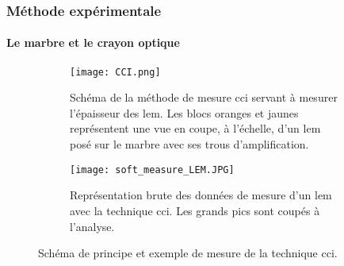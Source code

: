             \subsubsection{Méthode expérimentale}
                \paragraph{Le marbre et le crayon optique}
                    
                    \begin{figure}[htpb]
                        \begin{subfigure}{0.48\textwidth}
                            \texttt{[image: CCI.png]}
                            \caption[Schéma de la méthode de mesure \gls{cci}.]{Schéma de la méthode de mesure \gls{cci} servant à mesurer l'épaisseur des \gls{lem}. Les blocs oranges et jaunes représentent une vue en coupe, à l'échelle, d'un \gls{lem} posé sur le marbre avec ses trous d'amplification.}
                            \label{fig::CCI}
                        \end{subfigure}
                        \hfill
                        \begin{subfigure}{0.48\textwidth}
                            \texttt{[image: soft\_measure\_LEM.JPG]}
                            \caption[Représentation brute des données de mesure d'un \gls{lem} avec la technique \gls{cci}.]{Représentation brute des données de mesure d'un \gls{lem} avec la technique \gls{cci}. Les grands pics sont coupés à l'analyse.}
                            \label{fig::soft_measure_LEM}
                        \end{subfigure}
                        \caption[Schéma de principe et exemple de mesure de la technique \gls{cci}.]{Schéma de principe et exemple de mesure de la technique \gls{cci}.}
                    \end{figure}
                    
